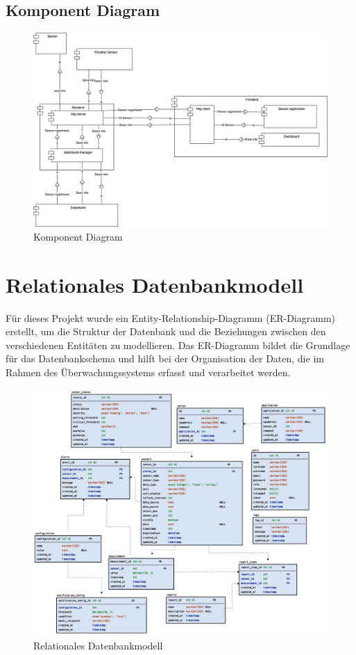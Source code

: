 \subsection{Komponent Diagram}\label{appendix:a5}\par
\begin{figure}[h]
	\centering
	\includegraphics[width=1\textwidth]{img/komponent_diagram.png}
	\caption{Komponent Diagram}
	\label{fig:example}
\end{figure}
\clearpage

\section{Relationales Datenbankmodell}\label{appendix:a6}\par

Für dieses Projekt wurde ein Entity-Relationship-Diagramm (ER-Diagramm) erstellt, um die Struktur der Datenbank und die Beziehungen zwischen den verschiedenen Entitäten zu modellieren. Das ER-Diagramm bildet die Grundlage für das Datenbankschema und hilft bei der Organisation der Daten, die im Rahmen des Überwachungssystems erfasst und verarbeitet werden.
\begin{figure}[h]
	\centering
	\includegraphics[width=1\textwidth]{img/ERP-diagramm.png}
	\caption{Relationales Datenbankmodell}
	\label{fig:example}
\end{figure}
\clearpage

